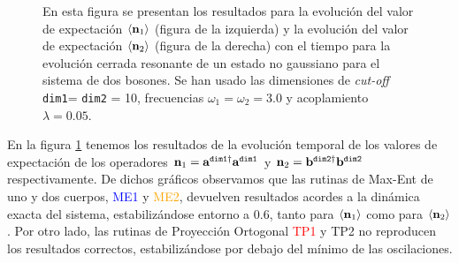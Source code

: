 \documentclass{report} %
\newcommand{\lgg}{\langle}
\newcommand{\rgg}{\rangle}
\numberwithin{equation}{section}
\begin{document}
\begin{figure}
    \centering
    \qquad
    \caption{En esta figura se presentan los resultados para la evolución del valor de expectación $\lgg {\bf n}_1 \rgg$ (figura de la izquierda) y la evolución del valor de expectación $\lgg {\bf n}_2 \rgg$ (figura de la derecha) con el tiempo para la evolución cerrada resonante de un estado no gaussiano para el sistema de dos bosones. Se han usado las dimensiones de \textit{cut-off} \texttt{dim1}= \texttt{dim2} = 10, frecuencias $\omega_1 = \omega_2 = 3.0$ y acoplamiento $\lambda = 0.05$.}
    \label{ocupations_closed_res}
\end{figure}

En la figura \ref{ocupations_closed_res} tenemos los resultados de la evolución temporal de los valores de expectación de los operadores ${\bf n}_1 = {\bf a}^{\texttt{dim1}\dagger} {\bf a}^{\texttt{dim1}}$ y ${\bf n}_2 = {\mathbf b}^{\texttt{dim2}\dagger} {\mathbf b}^{\texttt{dim2}}$ respectivamente. De dichos gráficos observamos que las rutinas de Max-Ent de uno y dos cuerpos, \textcolor{blue}{ME1} y \textcolor{orange}{ME2}, devuelven resultados acordes a la dinámica exacta del sistema, estabilizándose entorno a $0.6$, tanto para $\lgg{\bf n}_1\rgg$ como para $\lgg{\bf n}_2\rgg$. Por otro lado, las rutinas de Proyección Ortogonal \textcolor{red}{TP1} y \textcolor{dark green}{TP2} no reproducen los resultados correctos, estabilizándose por debajo del mínimo de las oscilaciones. 
\end{document}
